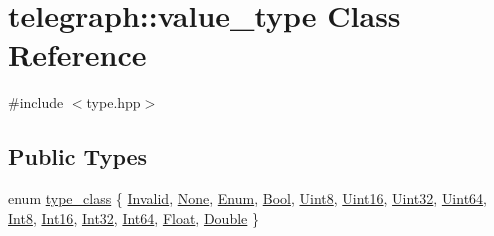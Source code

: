 \hypertarget{classtelegraph_1_1value__type}{}\section{telegraph\+:\+:value\+\_\+type Class Reference}
\label{classtelegraph_1_1value__type}


{\ttfamily \#include $<$type.\+hpp$>$}

\subsection*{Public Types}
\begin{DoxyCompactItemize}
\item 
enum \hyperlink{classtelegraph_1_1value__type_a516081c0a4e231cb22554f48f052ff6f}{type\+\_\+class} \{ \newline
\hyperlink{classtelegraph_1_1value__type_a516081c0a4e231cb22554f48f052ff6facc1cc882a8c85bf3a7987a1a4c50b514}{Invalid}, 
\hyperlink{classtelegraph_1_1value__type_a516081c0a4e231cb22554f48f052ff6fa0f82b021ca18b56f4abab49c89f89581}{None}, 
\hyperlink{classtelegraph_1_1value__type_a516081c0a4e231cb22554f48f052ff6fab64feb81a951ff765b7f4b0c59f166d2}{Enum}, 
\hyperlink{classtelegraph_1_1value__type_a516081c0a4e231cb22554f48f052ff6faa377f01fbedf8f2a836f7e4981021152}{Bool}, 
\newline
\hyperlink{classtelegraph_1_1value__type_a516081c0a4e231cb22554f48f052ff6fa4b710893b87196f36fbf648f5251e254}{Uint8}, 
\hyperlink{classtelegraph_1_1value__type_a516081c0a4e231cb22554f48f052ff6fab29d35200c30b177146478c4d107b6d2}{Uint16}, 
\hyperlink{classtelegraph_1_1value__type_a516081c0a4e231cb22554f48f052ff6fae1831c5eda2e34c43cacc2700795b273}{Uint32}, 
\hyperlink{classtelegraph_1_1value__type_a516081c0a4e231cb22554f48f052ff6fade1493c48a66f0d966ba499cbc6e02ec}{Uint64}, 
\newline
\hyperlink{classtelegraph_1_1value__type_a516081c0a4e231cb22554f48f052ff6fa36a0435c0dac230b0b3e77d82bfbe40a}{Int8}, 
\hyperlink{classtelegraph_1_1value__type_a516081c0a4e231cb22554f48f052ff6fa32be90cd2578a1ecc5407a6a3d5e8b45}{Int16}, 
\hyperlink{classtelegraph_1_1value__type_a516081c0a4e231cb22554f48f052ff6fa97911bd7c00117307f3b4f89baee8469}{Int32}, 
\hyperlink{classtelegraph_1_1value__type_a516081c0a4e231cb22554f48f052ff6fac678762a768d703603e032a20a0bcb2e}{Int64}, 
\newline
\hyperlink{classtelegraph_1_1value__type_a516081c0a4e231cb22554f48f052ff6fa0ade428faaf4b7bc8d441e7801e9f3e7}{Float}, 
\hyperlink{classtelegraph_1_1value__type_a516081c0a4e231cb22554f48f052ff6fac04c93c7547053995e928b1924a01b89}{Double}
 \}
\end{DoxyCompactItemize}
